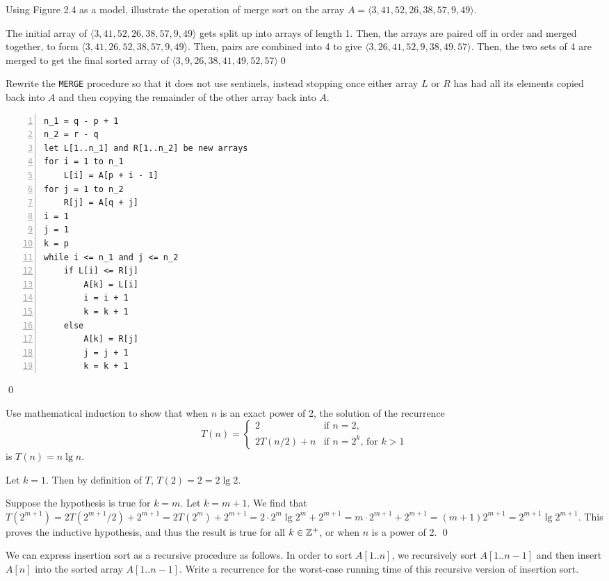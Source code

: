  Using Figure 2.4 as a model, illustrate the operation of merge sort on the array $A = \langle 3, 41, 52, 26, 38, 57, 9, 49 \rangle$.

\sol The initial array of $\langle 3, 41, 52, 26, 38, 57, 9, 49\rangle$ gets split up into arrays of length 1. Then, the arrays are paired off in order and merged together, to form $\langle 3, 41, 26, 52, 38, 57, 9, 49\rangle$. Then, pairs are combined into 4 to give $\langle 3, 26, 41, 52, 9, 38, 49, 57\rangle$. Then, the two sets of 4 are merged to get the final sorted array of $\langle3, 9, 26, 38, 41, 49, 52, 57\rangle$\qed

 Rewrite the \verb|MERGE| procedure so that it does not use sentinels, instead stopping once either array $L$ or $R$ has had all its elements copied back into $A$ and then copying the remainder of the other array back into $A$.

\sol \begin{Verbatim}[frame=single,numbers=left,samepage=true,label={MERGE(A, p, q, r)}]
n_1 = q - p + 1
n_2 = r - q
let L[1..n_1] and R[1..n_2] be new arrays
for i = 1 to n_1
    L[i] = A[p + i - 1]
for j = 1 to n_2
    R[j] = A[q + j]
i = 1
j = 1
k = p
while i <= n_1 and j <= n_2
    if L[i] <= R[j]
        A[k] = L[i]
        i = i + 1
        k = k + 1
    else
        A[k] = R[j]
        j = j + 1
        k = k + 1
\end{Verbatim}
\qed

 Use mathematical induction to show that when $n$ is an exact power of 2, the solution of the recurrence $$T(n) = \begin{cases} 2 & \text{if } n = 2, \\ 2T(n/2) + n & \text{if } n = 2^k \text{, for } k > 1 \end{cases}$$ is $T(n) = n \lg n$.

\sol Let $k = 1$. Then by definition of $T$, $T(2) = 2 = 2 \lg 2$.

Suppose the hypothesis is true for $k = m$. Let $k = m+1$. We find that $T(2^{m+1}) = 2T(2^{m+1}/2) + 2^{m+1} = 2T(2^m) + 2^{m+1} = 2\cdot 2^m \lg 2^m + 2^{m+1} = m\cdot 2^{m+1} + 2^{m+1} = (m+1)2^{m+1} = 2^{m+1} \lg 2^{m+1}$. This proves the inductive hypothesis, and thus the result is true for all $k \in \mathbb{Z}^+$, or when $n$ is a power of 2. \qed

 We can express insertion sort as a recursive procedure as follows. In order to sort $A[1..n]$, we recursively sort $A[1..n-1]$ and then insert $A[n]$ into the sorted array $A[1..n-1]$. Write a recurrence for the worst-case running time of this recursive version of insertion sort.

